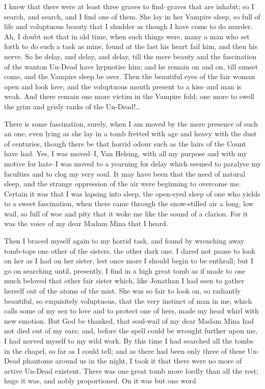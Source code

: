 \documentclass[12pt,openright]{book}
\begin{document}
I knew that there were at least three graves to find–graves that are inhabit; so I search, and search, and I find one of them. She lay in her Vampire sleep, so full of life and voluptuous beauty that I shudder as though I have come to do murder. Ah, I doubt not that in old time, when such things were, many a man who set forth to do such a task as mine, found at the last his heart fail him, and then his nerve. So he delay, and delay, and delay, till the mere beauty and the fascination of the wanton Un-Dead have hypnotise him; and he remain on and on, till sunset come, and the Vampire sleep be over. Then the beautiful eyes of the fair woman open and look love, and the voluptuous mouth present to a kiss–and man is weak. And there remain one more victim in the Vampire fold; one more to swell the grim and grisly ranks of the Un-Dead!…

There is some fascination, surely, when I am moved by the mere presence of such an one, even lying as she lay in a tomb fretted with age and heavy with the dust of centuries, though there be that horrid odour such as the lairs of the Count have had. Yes, I was moved–I, Van Helsing, with all my purpose and with my motive for hate–I was moved to a yearning for delay which seemed to paralyse my faculties and to clog my very soul. It may have been that the need of natural sleep, and the strange oppression of the air were beginning to overcome me. Certain it was that I was lapsing into sleep, the open-eyed sleep of one who yields to a sweet fascination, when there came through the snow-stilled air a long, low wail, so full of woe and pity that it woke me like the sound of a clarion. For it was the voice of my dear Madam Mina that I heard.

Then I braced myself again to my horrid task, and found by wrenching away tomb-tops one other of the sisters, the other dark one. I dared not pause to look on her as I had on her sister, lest once more I should begin to be enthrall; but I go on searching until, presently, I find in a high great tomb as if made to one much beloved that other fair sister which, like Jonathan I had seen to gather herself out of the atoms of the mist. She was so fair to look on, so radiantly beautiful, so exquisitely voluptuous, that the very instinct of man in me, which calls some of my sex to love and to protect one of hers, made my head whirl with new emotion. But God be thanked, that soul-wail of my dear Madam Mina had not died out of my ears; and, before the spell could be wrought further upon me, I had nerved myself to my wild work. By this time I had searched all the tombs in the chapel, so far as I could tell; and as there had been only three of these Un-Dead phantoms around us in the night, I took it that there were no more of active Un-Dead existent. There was one great tomb more lordly than all the rest; huge it was, and nobly proportioned. On it was but one word
\end{document}
